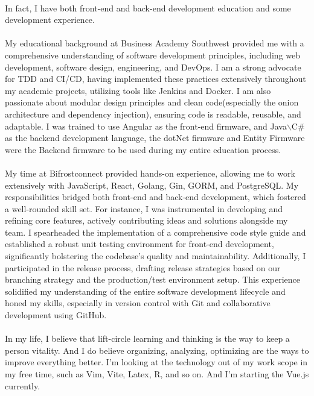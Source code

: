 \documentclass[grey]{hipstercv}
\begin{document}
\paragraph{}
In fact, I have both front-end and back-end development education and some development experience. 

\paragraph{}
My educational background at Business Academy Southwest provided me with a comprehensive understanding of software development principles, including web development, software design, engineering, and DevOps. I am a strong advocate for TDD and CI/CD, having implemented these practices extensively throughout my academic projects, utilizing tools like Jenkins and Docker. I am also passionate about modular design principles and clean code(especially the onion architecture and dependency injection), ensuring code is readable, reusable, and adaptable.
I was trained to use Angular as the front-end firmware, and Java$\backslash$C\# as the backend development language, the dotNet firmware and Entity Firmware were the Backend firmware to be used during my entire education process. 

\paragraph{}
My time at Bifrostconnect provided hands-on experience, allowing me to work extensively with JavaScript, React, Golang, Gin, GORM, and PostgreSQL. My responsibilities bridged both front-end and back-end development, which fostered a well-rounded skill set. For instance, I was instrumental in developing and refining core features, actively contributing ideas and solutions alongside my team. I spearheaded the implementation of a comprehensive code style guide and established a robust unit testing environment for front-end development, significantly bolstering the codebase's quality and maintainability. 
Additionally, I participated in the release process, drafting release strategies based on our branching strategy and the production/test environment setup. This experience solidified my understanding of the entire software development lifecycle and honed my skills, especially in version control with Git and collaborative development using GitHub. 

\paragraph{}
In my life, I believe that lift-circle learning and thinking is the way to keep a person vitality. And I do believe organizing, analyzing, optimizing are the ways to improve everything better. I'm looking at the technology out of my work scope in my free time, such as Vim, Vite, Latex, R, and so on. And I'm starting the Vue.js currently.
\end{document}
